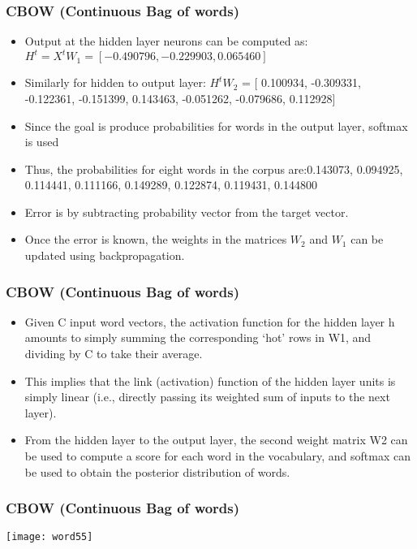 \begin{frame}[fragile]\frametitle{CBOW (Continuous Bag of words)}
\begin{itemize}
\item Output at the hidden layer neurons can be computed as: $H^t = X^tW_1 = [-0.490796, -0.229903, 0.065460]$
\item Similarly for hidden to output layer: $H^tW_2$ = {\small[ 0.100934,  -0.309331,  -0.122361,  -0.151399,   0.143463,  -0.051262,  -0.079686,   0.112928]}
\item Since the goal is produce probabilities for words in the output layer, softmax is used
\item Thus, the probabilities for eight words in the corpus are:{\small 0.143073,   0.094925,   0.114441,   0.111166,   0.149289,   0.122874,   0.119431,   0.144800}
\item Error is by subtracting probability vector from the target vector.
\item Once the error is known, the weights in the matrices $W_2$ and $W_1$ can be updated using backpropagation.
\end{itemize}
\end{frame}


\begin{frame}[fragile]\frametitle{CBOW (Continuous Bag of words)}
\begin{itemize}
\item Given C input word vectors, the activation function for the hidden layer h amounts to simply summing the corresponding `hot' rows in W1, and dividing by C to take their average.
\item This implies that the link (activation) function of the hidden layer units is simply linear (i.e., directly passing its weighted sum of inputs to the next layer). 
\item From the hidden layer to the output layer, the second weight matrix W2 can be used to compute a score for each word in the vocabulary, and softmax can be used to obtain the posterior distribution of words.
\end{itemize}
\end{frame}

\begin{frame}[fragile]\frametitle{CBOW (Continuous Bag of words)}
\begin{center}
\texttt{[image: word55]}
\end{center}
\end{frame}

